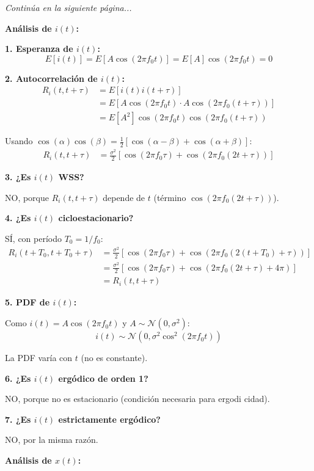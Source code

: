 \documentclass[10pt,a4paper]{article}
\begin{document}
\textit{Continúa en la siguiente página...}

\begin{solucion}
\textbf{Análisis de $i(t)$:}

\textbf{1. Esperanza de $i(t)$:}
\[
E[i(t)] = E[A \cos(2\pi f_0 t)] = E[A] \cos(2\pi f_0 t) = 0
\]

\textbf{2. Autocorrelación de $i(t)$:}
\begin{align*}
R_i(t, t+\tau) &= E[i(t)i(t+\tau)]\\
&= E[A \cos(2\pi f_0 t) \cdot A \cos(2\pi f_0 (t+\tau))]\\
&= E[A^2] \cos(2\pi f_0 t) \cos(2\pi f_0 (t+\tau))
\end{align*}

Usando $\cos(\alpha)\cos(\beta) = \frac{1}{2}[\cos(\alpha-\beta) + \cos(\alpha+\beta)]$:
\begin{align*}
R_i(t, t+\tau) &= \frac{\sigma^2}{2}[\cos(2\pi f_0 \tau) + \cos(2\pi f_0 (2t + \tau))]
\end{align*}

\textbf{3. ¿Es $i(t)$ WSS?}

NO, porque $R_i(t, t+\tau)$ depende de $t$ (término $\cos(2\pi f_0 (2t + \tau))$).

\textbf{4. ¿Es $i(t)$ cicloestacionario?}

SÍ, con período $T_0 = 1/f_0$:
\begin{align*}
R_i(t + T_0, t + T_0 + \tau) &= \frac{\sigma^2}{2}[\cos(2\pi f_0 \tau) + \cos(2\pi f_0 (2(t+T_0) + \tau))]\\
&= \frac{\sigma^2}{2}[\cos(2\pi f_0 \tau) + \cos(2\pi f_0 (2t + \tau) + 4\pi)]\\
&= R_i(t, t+\tau)
\end{align*}

\textbf{5. PDF de $i(t)$:}

Como $i(t) = A \cos(2\pi f_0 t)$ y $A \sim \mathcal{N}(0, \sigma^2)$:
\[
i(t) \sim \mathcal{N}(0, \sigma^2 \cos^2(2\pi f_0 t))
\]

La PDF varía con $t$ (no es constante).

\textbf{6. ¿Es $i(t)$ ergódico de orden 1?}

NO, porque no es estacionario (condición necesaria para ergodi cidad).

\textbf{7. ¿Es $i(t)$ estrictamente ergódico?}

NO, por la misma razón.

\vspace{5mm}
\textbf{Análisis de $x(t)$:}


\end{solucion}
\end{document}
